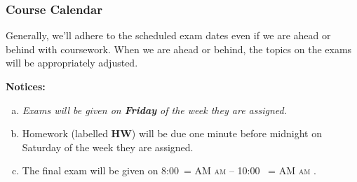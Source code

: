 \documentclass[12pt]{article}
\makeatletter
\newcounter{ex}\setcounter{ex}{0}
\newenvironment{alphalist}{
  \begin{enumerate}[(a)]
    \addtolength{\itemsep}{-0.5\itemsep}}
  {\end{enumerate}}
\DeclareRobustCommand{\maybefakesc}[1]{%
  \ifnum\pdfstrcmp{\f@series}{\bfdefault}=\z@
    {\fontsize{\dimexpr0.8\dimexpr\f@size pt\relax}{0}\selectfont\uppercase{#1}}%
  \else
    \textsc{#1}%
  \fi
}
\newcommand\AM{\,\maybefakesc{am}\xspace}
\newcommand{\finaldateandtime}{\printdate{14/12/\the\year} 8:00\AM{} -- 10:00 \AM}
\makeatother
\begin{document}
\subsubsection*{Course Calendar}

Generally, we'll adhere to the scheduled exam dates even if we are ahead or behind with coursework.  
When we are ahead or behind, the topics on the exams will be appropriately adjusted.  


\vspace{0.1in}
\noindent \textbf{Notices:}


\begin{alphalist}
   \item \emph{Exams will be given on  \textbf{Friday} of the week they are assigned.}
   

    \item Homework (labelled \textbf{HW}) will be due one minute before midnight on  Saturday of the week they are assigned.  

    \item The final exam will be given on \finaldateandtime.
    
\end{alphalist}

\vspace{0.1in}
\end{document}
